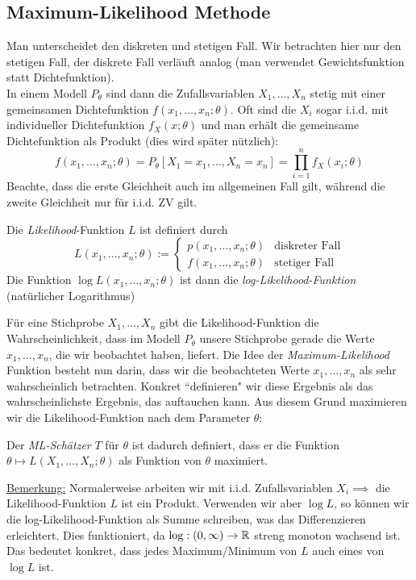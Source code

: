 \subsection{Maximum-Likelihood Methode}
Man unterscheidet den diskreten und stetigen Fall. Wir betrachten hier nur den stetigen Fall, der diskrete Fall verläuft analog (man verwendet Gewichtsfunktion statt Dichtefunktion).\\

In einem Modell $P_\theta$ sind dann die Zufallsvariablen $X_1,\dots,X_n$ stetig mit einer gemeinsamen Dichtefunktion $f(x_1,\dots,x_n; \theta)$. Oft sind die $X_i$ sogar i.i.d. mit individueller Dichtefunktion $f_X(x;\theta)$ und man erhält die gemeinsame Dichtefunktion als Produkt (dies wird später nützlich):
$$ f(x_1,\dots,x_n; \theta) = P_\theta[X_1 = x_1, \dots, X_n = x_n] = \prod_{i=1}^n f_X(x_i;\theta)$$
Beachte, dass die erste Gleichheit auch im allgemeinen Fall gilt, während die zweite Gleichheit nur für i.i.d. ZV gilt.
\begin{definition}
Die \textit{Likelihood}-Funktion $L$ ist definiert durch 
$$  L(x_1,\dots,x_n;\theta) := \begin{cases} p(x_1,\dots,x_n; \theta) & \mbox{diskreter Fall} \\ f(x_1,\dots,x_n;\theta) & \mbox{stetiger Fall} \end{cases} $$
Die Funktion $\log L(x_1,\dots,x_n;\theta)$ ist dann die \textit{log-Likelihood-Funktion}\\ (natürlicher Logarithmus)
\end{definition}

Für eine Stichprobe $X_1,\dots,X_n$ gibt die Likelihood-Funktion die Wahrscheinlichkeit, dass im Modell $P_\theta$ unsere Stichprobe gerade die Werte $x_1,\dots,x_n$, die wir beobachtet haben, liefert. Die Idee der \textit{Maximum-Likelihood} Funktion besteht nun darin, dass wir die beobachteten Werte $x_1,\dots,x_n$ als sehr wahrscheinlich betrachten. Konkret ``definieren" wir diese Ergebnis als das wahrscheinlichste Ergebnis, das auftauchen kann. Aus diesem Grund maximieren wir die Likelihood-Funktion nach dem Parameter $\theta$:
\begin{definition}
Der \textit{ML-Schätzer} $T$ für $\theta$ ist dadurch definiert, dass er die Funktion $\theta \mapsto L(X_1, \dots, X_n; \theta)$ als Funktion von $\theta$ maximiert.
\end{definition}
\underline{Bemerkung:} Normalerweise arbeiten wir mit i.i.d. Zufallsvariablen $X_i \implies $ die Likelihood-Funktion $L$ ist ein Produkt. Verwenden wir aber $ \log L$, so können wir die log-Likelihood-Funktion als Summe schreiben, was das Differenzieren erleichtert. Dies funktioniert, da $\log: (0,\infty) \to \mathbb{R}$ streng monoton wachsend ist. Das bedeutet konkret, dass jedes Maximum/Minimum von $L$ auch eines von $\log L$ ist.\\

